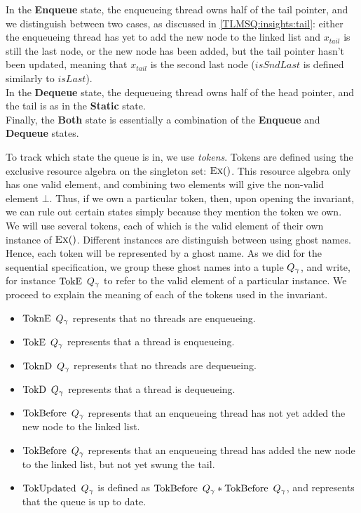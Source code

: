\documentclass[a4paper, 11pt]{report}
\newcommand{\StaticState}{\textbf{Static}}
\newcommand{\EnqueueState}{\textbf{Enqueue}}
\newcommand{\DequeueState}{\textbf{Dequeue}}
\newcommand{\BothState}{\textbf{Both}}
\newcommand{\Qg}{Q_\gname}
\newcommand{\TokE}[1]{\operatorname{TokE}\ #1}
\newcommand{\TokEQg}{\TokE{\Qg}}
\newcommand{\ToknE}[1]{\operatorname{ToknE}\ #1}
\newcommand{\ToknEQg}{\ToknE{\Qg}}
\newcommand{\TokD}[1]{\operatorname{TokD}\ #1}
\newcommand{\TokDQg}{\TokD{\Qg}}
\newcommand{\ToknD}[1]{\operatorname{ToknD}\ #1}
\newcommand{\ToknDQg}{\ToknD{\Qg}}
\newcommand{\TokBefore}[1]{\operatorname{TokBefore}\ #1}
\newcommand{\TokBeforeQg}{\TokBefore{\Qg}}
\newcommand{\TokAfterQg}{\TokBefore{\Qg}}
\newcommand{\TokUpdated}[1]{\operatorname{TokUpdated}\ #1}
\newcommand{\TokUpdatedQg}{\TokUpdated{\Qg}}
\begin{document}
In the \EnqueueState{} state, the enqueueing thread owns half of the tail pointer, and we distinguish between two cases, as discussed in \ref{TLMSQ:insights:tail}: either the enqueueing thread has yet to add the new node to the linked list and $x_{tail}$ is still the last node, or the new node has been added, but the tail pointer hasn't been updated, meaning that $x_{tail}$ is the second last node ($isSndLast$ is defined similarly to $isLast$).\\
In the \DequeueState{} state, the dequeueing thread owns half of the head pointer, and the tail is as in the \StaticState{} state.\\
Finally, the \BothState{} state is essentially a combination of the \EnqueueState{} and \DequeueState{} states.

To track which state the queue is in, we use \textit{tokens}. Tokens are defined using the exclusive resource algebra on the singleton set: $\textsc{Ex}{()}$. This resource algebra only has one valid element, and combining two elements will give the non-valid element $\bot$. Thus, if we own a particular token, then, upon opening the invariant, we can rule out certain states simply because they mention the token we own.\\
We will use several tokens, each of which is the valid element of their own instance of $\textsc{Ex}{()}$. Different instances are distinguish between using ghost names. Hence, each token will be represented by a ghost name. As we did for the sequential specification, we group these ghost names into a tuple $\Qg$, and write, for instance $\TokEQg$ to refer to the valid element of a particular instance. We proceed to explain the meaning of each of the tokens used in the invariant.
\begin{itemize}
  \item $\ToknEQg$ represents that no threads are enqueueing.
  \item $\TokEQg$ represents that a thread is enqueueing.
  \item $\ToknDQg$ represents that no threads are dequeueing.
  \item $\TokDQg$ represents that a thread is dequeueing.
  \item $\TokBeforeQg$ represents that an enqueueing thread has not yet added the new node to the linked list.
  \item $\TokAfterQg$ represents that an enqueueing thread has added the new node to the linked list, but not yet swung the tail.
  \item $\TokUpdatedQg$ is defined as $\TokBeforeQg \star \TokAfterQg$, and represents that the queue is up to date.
\end{itemize}
\end{document}
